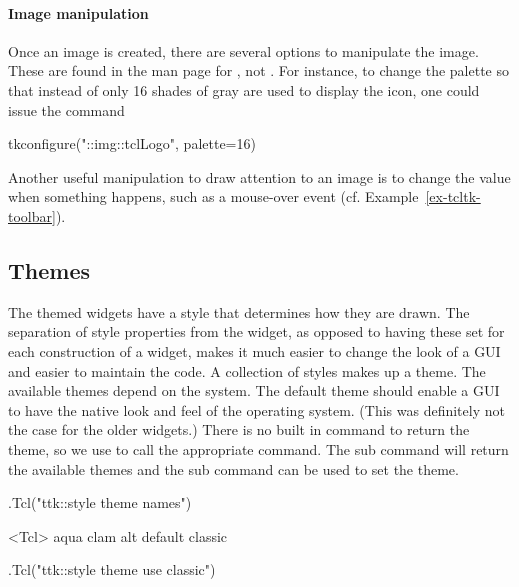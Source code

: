 \paragraph{Image manipulation}
Once an image is created, there are several options to manipulate the
image. These are found in the \TK\/ man page for , not
. For instance, to change the palette so that instead of
 only 16 shades of gray are used to display the icon,
one could issue the command
\begin{Schunk}
\begin{Sinput}
 tkconfigure("::img::tclLogo", palette=16)
\end{Sinput}
\end{Schunk}

Another useful manipulation to draw attention to an image is to change
the  value when something happens, such as a mouse-over
event (cf. Example~\ref{ex-tcltk-toolbar}).


\subsection{Themes}
\label{sec:tcltk:overview:themes}


The themed widgets have a style that determines how they are
drawn. The separation of style properties from the widget, as opposed
to having these set for each construction of a widget, makes it much
easier to change the look of a GUI and easier to maintain the code. A
collection of styles makes up a theme. The available themes depend on
the system. The default theme should enable a GUI to have the native
look and feel of the operating system. (This was definitely not the
case for the older \TK\/ widgets.) There is no built in command to
return the theme, so we use  to call the appropriate \TCL\/
command. The  sub command will return the available themes
and the  sub command can be used to set the theme.

\begin{Schunk}
\begin{Sinput}
 .Tcl("ttk::style theme names")
\end{Sinput}
\begin{Soutput}
<Tcl> aqua clam alt default classic 
\end{Soutput}
\begin{Sinput}
 .Tcl("ttk::style theme use classic")
\end{Sinput}
\end{Schunk}

